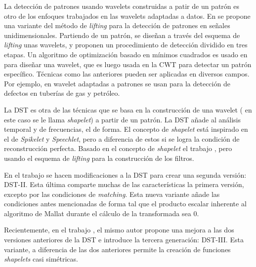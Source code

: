 La detección de patrones usando wavelets construidas a patir de un patrón es otro de los enfoques trabajados en las wavelets adaptadas a datos.  
En \cite{Mesa2005AdaptedWF} se propone una variante del método de \textit{lifting} para la detección de patrones en señales unidimensionales.
Partiendo de un patrón, se diseñan a través del esquema de \textit{ lifting } unas wavelets, y proponen un procedimiento
de detección dividido en tres etapas. Un algoritmo de optimización basado en mínimos cuadrados es usado en \cite{rpeak}
para diseñar una wavelet, que es luego usada en la CWT para detectar un patrón específico. 
Técnicas como las  anteriores pueden ser aplicadas en diversos campos. Por ejemplo, en \cite{Layouni2017} wavelet adaptadas a 
patrones se usan para la detección de defectos en tuberías de gas y petróleo.

La DST \cite{Guido2008} es otra de las técnicas que se basa en la construcción de una wavelet ( en este caso se le llama \textit{shapelet})
a partir de un patrón. La DST añade al análisis temporal y de frecuencias, el de forma. El concepto de \textit{shapelet}
está inspirado en el de \textit{Spikelet} y \textit{Speechlet}, pero a diferencia de estos si se logra  la condición
de reconstrucción perfecta. Basado en el concepto de \textit{shapelet} el trabajo \cite{lifting-shapelet}, pero usando
el esquema de \textit{lifting} para la construcción de los filtros. 

En el trabajo \cite{Guido2018} se hacen modificaciones a la DST para crear una segunda versión: DST-II. Esta última
comparte muchas de las características la primera versión, excepto por las condiciones de \textit{matching}.
Esta nueva variante añade las condiciones antes mencionadas de forma tal que el producto escalar inherente al algoritmo
de Mallat durante el cálculo de la transformada sea $0$.

Recientemente, en el trabajo \cite{Guido2021}, el mismo autor propone una mejora a las dos versiones anteriores de la 
DST e introduce la tercera generación: DST-III. Esta variante, a diferencia de las dos anteriores permite la creación
de funciones \textit{ shapelets} casi simétricas. 


